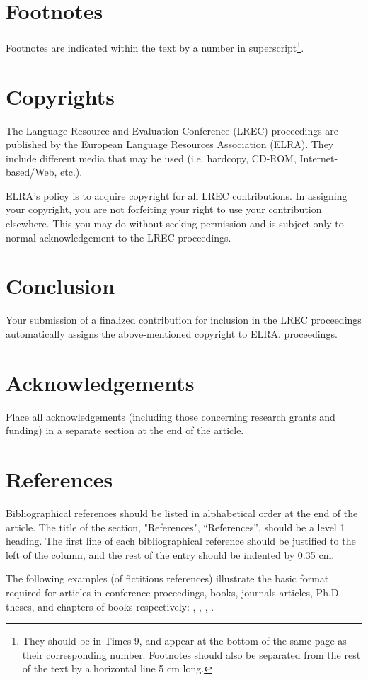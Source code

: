 \documentclass[10pt, a4paper]{article}
\begin{document}
\section{Footnotes}

Footnotes are indicated within the text by a number in superscript\footnote{They should be in Times 9, and appear at the bottom of the same page as their corresponding number. Footnotes should also be separated from the rest of the text by a horizontal line 5 cm long.}.

\section{Copyrights}

The Lan\-gua\-ge Re\-sour\-ce and Evalua\-tion Con\-fe\-rence (LREC) proceedings are published by the European Language Resources Association (ELRA). They include different media that may be used (i.e. hardcopy, CD-ROM, Internet-based/Web, etc.).

ELRA's policy is to acquire copyright for all LREC contributions. In assigning your copyright, you are not forfeiting your right to use your contribution elsewhere. This you may do without seeking permission and is subject only to normal acknowledgement to the LREC proceedings.

\section{Conclusion}

Your submission of a finalized contribution for inclusion in the LREC proceedings automatically assigns the above-mentioned copyright to ELRA.
proceedings.

\section{Acknowledgements}

Place all acknowledgements (including those concerning research grants and funding) in a separate section at the end of the article.

\section{References}
Bibliographical references should be listed in alphabetical order at the end of the article. The title of the section, "References", ``References'', should be a level 1 heading. The first line of each bibliographical reference should be justified to the left of the column, and the rest of the entry should be indented by 0.35 cm.

The following examples (of fictitious references) illustrate the basic format required for articles in conference proceedings, books, journals articles, Ph.D. theses, and chapters of books respectively:
\cite{Martin-90},  \cite{Chercheur-94},  \cite{CastorPollux-92}  \cite{Zavatta-92},  \cite{Grandchercheur-83}.




\end{document}
